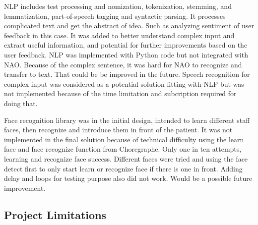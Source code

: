 \documentclass[conference]{IEEEtran}
\begin{document}
NLP includes test processing and nomization, tokenization, stemming, and lemmatization, part-of-speech tagging and syntactic parsing. It processes complicated text and get the abstract of idea. Such as analyzing sentiment of user feedback in this case. It was added to better understand complex input and extract useful information, and potential for further improvements based on the user feedback. NLP was implemented with Python code but not integrated with NAO. Because of the complex sentence, it was hard for NAO to recognize and transfer to text. That could be be improved in the future. Speech recognition for complex input was considered as a potential solution fitting with NLP but was not implemented because of the time limitation and subcription required for doing that.

Face recognition library was in the initial design, intended to learn different staff faces, then recognize and introduce them in front of the patient. It was not implemented in the final solution because of technical difficulty using the learn face and face recognize function from Choregraphe. Only one in ten attempts, learning and recognize face success. Different faces were tried and using the face detect first to only start learn or recognize face if there is one in front. Adding delay and loops for testing purpose also did not work. Would be a possible future improvement.


\subsection{Project Limitations}
\end{document}
